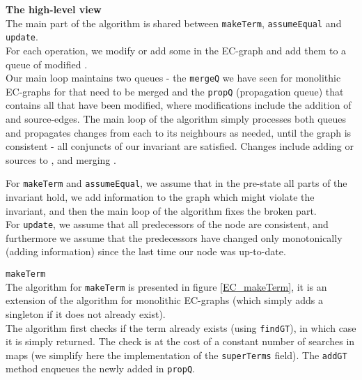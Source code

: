 \noindent
\textbf{The high-level view}\\
The main part of the algorithm is shared between \lstinline|makeTerm|, \lstinline|assumeEqual| and \lstinline|update|.\\
For each operation, we modify or add some \GTs{} in the EC-graph and add them to a queue of modified \GTs{}.\\
Our main loop maintains two queues - the \lstinline|mergeQ| we have seen for monolithic EC-graphs for \GTs{} that need to be merged and the \lstinline|propQ| (propagation queue) that contains all \GTs{} that have been modified, where modifications include the addition of \GFAs{} and source-edges.
The main loop of the algorithm simply processes both queues and propagates changes from each \GT{} to its neighbours as needed, until the graph is consistent - all conjuncts of our invariant are satisfied. Changes include adding \GFAs{} or sources to \GTs{}, and merging \GTs{}. 

\bigskip
\noindent
For \lstinline|makeTerm| and \lstinline|assumeEqual|, we assume that in the pre-state all parts of the invariant hold, we add information to the graph which might violate the invariant, and then the main loop of the algorithm fixes the broken part.\\
For \lstinline|update|, we assume that all predecessors of the node are consistent, and furthermore we assume that the predecessors have changed only monotonically (adding information) since the last time our node was up-to-date.

\bigskip
\noindent
\lstinline{makeTerm}\\
The algorithm for \lstinline|makeTerm| is presented in figure \ref{EC_makeTerm}, it is an extension of the algorithm for monolithic EC-graphs (which simply adds a singleton \GT{} if it does not already exist).\\
The algorithm first checks if the term already exists (using \lstinline|findGT|), in which case it is simply returned. 
The check is at the cost of a constant number of searches in maps (we simplify here the implementation of the \lstinline|superTerms| field). 
The \lstinline|addGT| method enqueues the newly added \GT{} in \lstinline|propQ|.


